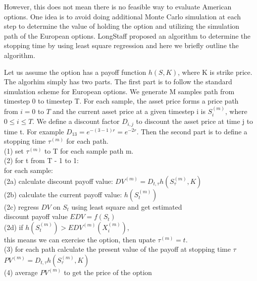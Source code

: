 \documentclass[a4paper]{article}
\begin{document}
However, this does not mean there is no feasible way to evaluate American options. One idea is to avoid doing additional Monte Carlo simulation at each step to determine the value of holding the option and utilizing the simulation path of the European options. LongStaff\cite{americanoption} proposed an algorithm to determine the stopping time by using least square regression and here we briefly outline the algorithm.

Let us assume the option has a payoff function $h(S, K)$, where K is strike price.
The algorhim simply has two parts. The first part is to follow the standard simulation scheme for European options. We generate M samples path from timestep 0 to timestep T. For each sample, the asset price forms a price path from $i = 0$ to $T$ and the current asset price at a given timestep i is $S^{(m)}_i$, where $0 \leq i \leq T$. We define a discount factor $D_{i,j}$ to discount the asset price at time j to time t. For example $D_{13} = e^{-(3-1)r} = e^{-2r}$. 
Then the second part is to define a stopping time $\tau^{(m)}$ for each path. \\
(1) set $\tau^{(m)}$ to T for each sample path m.\\
(2) for t from T - 1 to 1:\\
\indent  \indent  for each sample:\\
\indent  \indent \indent(2a) calculate discount payoff value: $DV^{(m)} = D_{t, \tau} h(S^{(m)}_\tau, K) $\\
\indent  \indent \indent(2b) calculate the current payoff value: $h(S^{(m)}_t)$\\
\indent	 \indent \indent(2c) regress $DV$ on ${S_t}$ using least square and get estimated \\
\indent  \indent \indent    discount payoff value $EDV = f(S_t)$\\
\indent	 \indent \indent(2d) if $h(S^{(m)}_t) > EDV^{(m)}(X^{(m)}_i)$, \\
\indent  \indent \indent     this means we can exercise the option, then upate $\tau^{(m)} = t$.\\
(3) for each path calculate the present value of the payoff at stopping time $\tau$ \\
$PV^{(m)} = D_{t, \tau} h(S^{(m)}_\tau, K)$\\
(4) average $PV^{(m)}$ to get the price of the option\\
\end{document}
